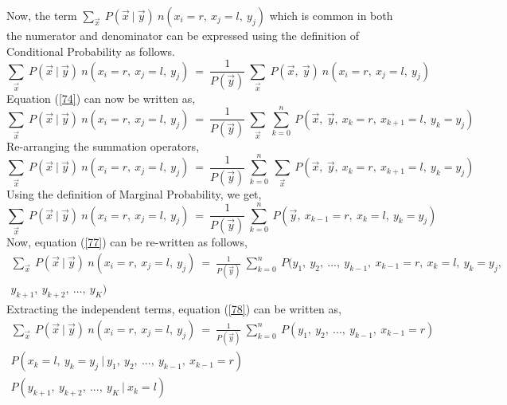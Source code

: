 \documentclass[12pt, draftcls, onecolumn]{IEEEtran}
\begin{document}
Now, the term $\sum_{\vec{x}}\ P(\vec{x}\ |\ \vec{y})\ n(x_i=r,\ x_j=l,\ y_j)$ which is common in both the numerator and denominator can be expressed using the definition of Conditional Probability as follows.
\begin{equation}\label{74}
    \sum_{\vec{x}}\ P(\vec{x}\ |\ \vec{y})\ n(x_i=r,\ x_j=l,\ y_j)\ =\ \frac{1}{P(\vec{y})}\ \sum_{\vec{x}}\ P(\vec{x},\ \vec{y})\ n(x_i=r,\ x_j=l,\ y_j)
\end{equation}
Equation (\ref{74}) can now be written as,
\begin{equation}\label{75}
    \sum_{\vec{x}}\ P(\vec{x}\ |\ \vec{y})\ n(x_i=r,\ x_j=l,\ y_j)\ =\ \frac{1}{P(\vec{y})}\ \sum_{\vec{x}}\ \sum_{k=0}^{n}\ P(\vec{x},\ \vec{y},\ x_k=r,\ x_{k+1}=l,\ y_k=y_j)
\end{equation}
Re-arranging the summation operators,
\begin{equation}\label{76}
    \sum_{\vec{x}}\ P(\vec{x}\ |\ \vec{y})\ n(x_i=r,\ x_j=l,\ y_j)\ =\ \frac{1}{P(\vec{y})}\ \sum_{k=0}^{n}\ \sum_{\vec{x}}\ P(\vec{x},\ \vec{y},\ x_k=r,\ x_{k+1}=l,\ y_k=y_j)
\end{equation}
Using the definition of Marginal Probability, we get,
\begin{equation}\label{77}
    \sum_{\vec{x}}\ P(\vec{x}\ |\ \vec{y})\ n(x_i=r,\ x_j=l,\ y_j)\ =\ \frac{1}{P(\vec{y})}\ \sum_{k=0}^{n}\ P(\vec{y},\ x_{k-1}=r,\ x_{k}=l,\ y_k=y_j)
\end{equation}
Now, equation (\ref{77}) can be re-written as follows,
\begin{equation}\label{78}
    \begin{aligned}
        \sum_{\vec{x}}\ P(\vec{x}\ |\ \vec{y})\ n(x_i=r,\ x_j=l,\ y_j)\ =\ \frac{1}{P(\vec{y})}\ \sum_{k=0}^{n}\ P(y_1,\ y_2,\ ...,\ y_{k-1},\ x_{k-1}=r,\ x_{k}=l,\ y_k=y_j,\\y_{k+1},\ y_{k+2},\ ...,\ y_K)
    \end{aligned}
\end{equation}
Extracting the independent terms, equation (\ref{78}) can be written as,
\begin{equation}\label{79}
    \begin{aligned}
        \sum_{\vec{x}}\ P(\vec{x}\ |\ \vec{y})\ n(x_i=r,\ x_j=l,\ y_j)\ =\ \frac{1}{P(\vec{y})}\ \sum_{k=0}^{n}\ P(y_1,\ y_2,\ ...,\ y_{k-1},\ x_{k-1}=r)\\P(x_{k}=l,\ y_k=y_j\ |\ y_1,\ y_2,\ ...,\ y_{k-1},\ x_{k-1}=r)\\P(y_{k+1},\ y_{k+2},\ ...,\ y_K\ |\ x_k=l)
    \end{aligned}
\end{equation}
\end{document}

